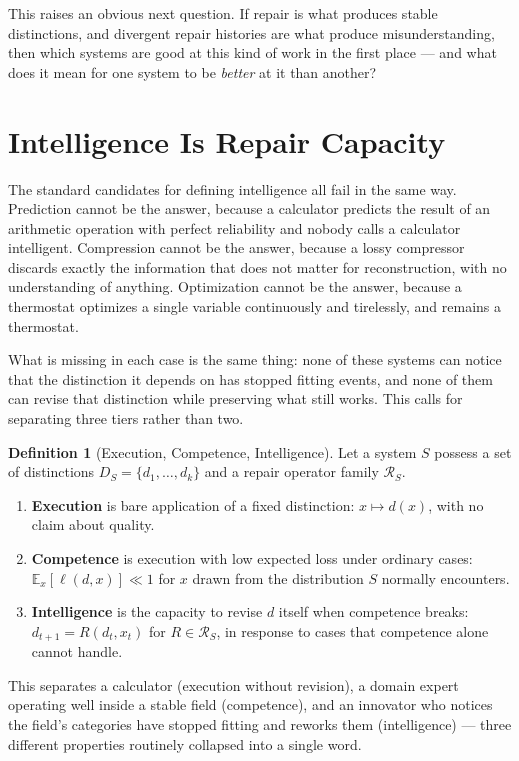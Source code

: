 \documentclass[11pt]{article}
\theoremstyle{plain}
\theoremstyle{definition}
\newtheorem{definition}[theorem]{Definition}
\theoremstyle{remark}
\begin{document}
This raises an obvious next question. If repair is what produces stable distinctions, and divergent repair histories are what produce misunderstanding, then which systems are good at this kind of work in the first place --- and what does it mean for one system to be \emph{better} at it than another?

\section{Intelligence Is Repair Capacity}

The standard candidates for defining intelligence all fail in the same way. Prediction cannot be the answer, because a calculator predicts the result of an arithmetic operation with perfect reliability and nobody calls a calculator intelligent. Compression cannot be the answer, because a lossy compressor discards exactly the information that does not matter for reconstruction, with no understanding of anything. Optimization cannot be the answer, because a thermostat optimizes a single variable continuously and tirelessly, and remains a thermostat.

What is missing in each case is the same thing: none of these systems can notice that the distinction it depends on has stopped fitting events, and none of them can revise that distinction while preserving what still works. This calls for separating three tiers rather than two.

\begin{definition}[Execution, Competence, Intelligence]
Let a system $S$ possess a set of distinctions $D_S = \{d_1,\dots,d_k\}$ and a repair operator family $\mathcal{R}_S$.
\begin{enumerate}[label=(\roman*),itemsep=2pt]
\item \textbf{Execution} is bare application of a fixed distinction: $x \mapsto d(x)$, with no claim about quality.
\item \textbf{Competence} is execution with low expected loss under ordinary cases: $\mathbb{E}_x[\ell(d,x)] \ll 1$ for $x$ drawn from the distribution $S$ normally encounters.
\item \textbf{Intelligence} is the capacity to revise $d$ itself when competence breaks: $d_{t+1} = R(d_t, x_t)$ for $R \in \mathcal{R}_S$, in response to cases that competence alone cannot handle.
\end{enumerate}
\end{definition}

This separates a calculator (execution without revision), a domain expert operating well inside a stable field (competence), and an innovator who notices the field's categories have stopped fitting and reworks them (intelligence) --- three different properties routinely collapsed into a single word.
\end{document}
